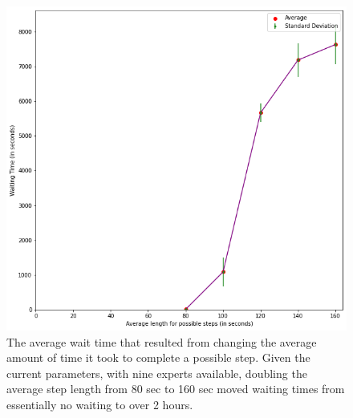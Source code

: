 \begin{figure}[H]
  \includegraphics[width=\textwidth]{figures/montecarlo/vary_step_length.png}
  \caption{
    The average wait time that resulted from changing the average amount of time
    it took to complete a possible step.
    Given the current parameters, with nine experts available, doubling the
    average
    step length from 80 sec to 160 sec moved waiting times from essentially no
    waiting to over 2 hours.
  }\label{fig:vary_step_length}
\end{figure}
